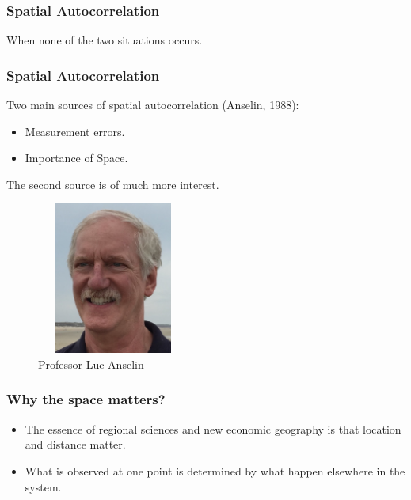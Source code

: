 \documentclass[english,10pt]{beamer}\usepackage[]{graphicx}\usepackage[]{xcolor}
\begin{document}
\begin{frame}
  \frametitle{Spatial Autocorrelation}
    \begin{definition}
    When none of the two situations occurs.
    \end{definition}
\end{frame}

\begin{frame}
  \frametitle{Spatial Autocorrelation}
    Two main sources of spatial autocorrelation (Anselin, 1988):
      \begin{itemize}
        \item Measurement errors.
        \item Importance of Space.
      \end{itemize}
      
    The second source is of much more interest.
    
    \begin{figure}
	\caption{Professor Luc Anselin}
\centering
	\includegraphics[width=5cm, height=5cm]{luc_anselin}
\end{figure}
\end{frame}

\begin{frame}
  \frametitle{Why the space matters?}
    \begin{itemize}
      \item The essence of regional sciences and new economic geography is that \alert{location and distance matter}.
      \item What is observed at one point is determined by what happen elsewhere in the system.
    \end{itemize}
\end{frame}
\end{document}
